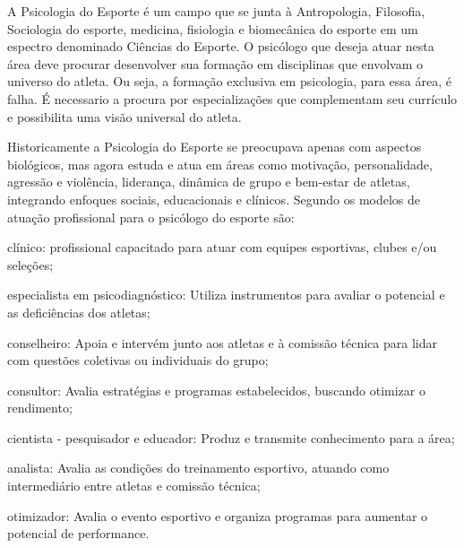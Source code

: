 \begin{Desenvolvimento} %

A Psicologia do Esporte é um campo que se junta à Antropologia, Filosofia, Sociologia do esporte, medicina, fisiologia e biomecânica do esporte em um espectro denominado Ciências do Esporte. O psicólogo que deseja atuar nesta área deve procurar desenvolver sua formação em  disciplinas que envolvam o universo do atleta. Ou seja, a formação exclusiva em psicologia, para essa área, é falha. É necessario a procura por especializações que complementam seu currículo e possibilita uma visão universal do atleta.

Historicamente a Psicologia do Esporte se preocupava apenas com aspectos biológicos, mas agora estuda e atua em áreas como motivação, personalidade, agressão e violência, liderança, dinâmica de grupo e bem-estar de atletas, integrando enfoques sociais, educacionais e clínicos. Segundo  os modelos de atuação profissional para o psicólogo do esporte são:

\begin{alinea}
  \item clínico: profissional capacitado para atuar com equipes esportivas, clubes e/ou seleções;
  \item especialista em psicodiagnóstico: Utiliza instrumentos para avaliar o potencial e as deficiências dos atletas;
  \item conselheiro: Apoia e intervém junto aos atletas e à comissão técnica para lidar com questões coletivas ou individuais do grupo;
  \item consultor: Avalia estratégias e programas estabelecidos, buscando otimizar o rendimento;
  \item cientista - pesquisador e educador: Produz e transmite conhecimento para a área;
  \item analista: Avalia as condições do treinamento esportivo, atuando como intermediário entre atletas e comissão técnica;
  \item otimizador: Avalia o evento esportivo e organiza programas para aumentar o potencial de performance.
\end{alinea}


\end{Desenvolvimento}
